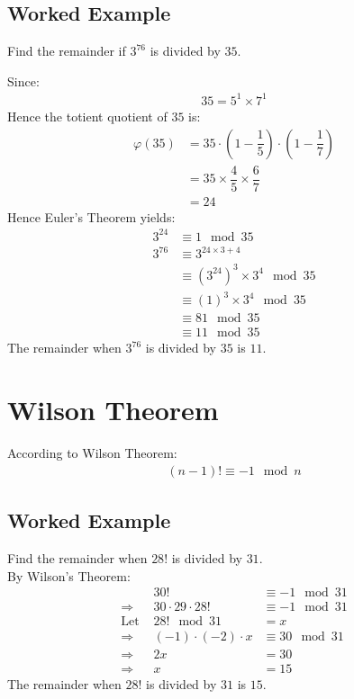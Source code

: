 \documentclass[../main.tex]{subfiles}
\begin{document}
	\subsection*{Worked Example}
	Find the remainder if $3^{76}$ is divided by $35$.\par
	Since:
	\begin{align*}
		35 = 5^1 \times 7^1
	\end{align*}
	Hence the totient quotient of $35$ is:
	\begin{align*}
		\varphi(35) & = 35 \cdot \left(1 - \dfrac{1}{5}\right)\cdot\left(1-\dfrac{1}{7}\right) \\ & = 35 \times \dfrac{4}{5} \times \dfrac{6}{7} \\ & = 24
	\end{align*}
	Hence Euler's Theorem yields:
	\begin{align*}
		3^{24} & \equiv 1 \mod 35 \\
		3^{76} & \equiv 3^{24 \times 3 + 4}\\
		& \equiv \left(3^{24}\right)^3 \times 3^4 \mod 35\\
		& \equiv \left(1\right)^3 \times 3^4 \mod 35\\
		& \equiv 81 \mod 35\\
		& \equiv 11 \mod 35
	\end{align*}
	The remainder when $3^{76}$ is divided by $35$ is $11$.
	
	\section{Wilson Theorem}
	According to Wilson Theorem:
	\begin{align}
		\left( n - 1 \right)! \equiv -1 \mod n
	\end{align}
	\subsection*{Worked Example}
	Find the remainder when $28!$ is divided by $31$.\\
	By Wilson's Theorem:
	\begin{align*}
		& 30! & \equiv -1 \mod 31 \\
		\Rightarrow & 30 \cdot 29 \cdot 28! & \equiv -1 \mod 31 \\
		\text{Let } & 28! \mod 31 & = x \\
		\Rightarrow & (-1) \cdot (-2) \cdot x & \equiv 30 \mod 31 \\
		\Rightarrow & 2x & = 30 \\
		\Rightarrow & x & = 15
	\end{align*}
	The remainder when $28!$ is divided by $31$ is $15$.
\end{document}

